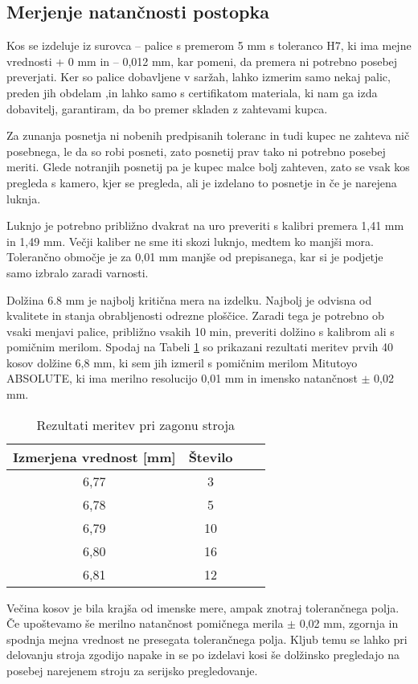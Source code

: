 \subsection{Merjenje natančnosti postopka}
Kos se izdeluje iz surovca -- palice s premerom 5 mm s toleranco
H7, ki ima mejne vrednosti + 0 mm in -- 0,012 mm, kar pomeni,
da premera ni potrebno posebej preverjati. Ker so palice
dobavljene v saržah, lahko izmerim samo nekaj palic, preden
jih obdelam ,in lahko samo s certifikatom materiala, ki nam
ga izda dobavitelj, garantiram, da bo premer skladen z
zahtevami kupca.

Za zunanja posnetja ni nobenih predpisanih toleranc in tudi
kupec ne zahteva nič posebnega, le da so robi posneti, zato posnetij prav tako ni potrebno posebej meriti. Glede notranjih
posnetij pa je kupec malce bolj zahteven, zato se
vsak kos pregleda s kamero, kjer se pregleda, ali je izdelano
to posnetje in če je narejena luknja.

Luknjo je potrebno približno dvakrat na uro preveriti s
kalibri premera 1,41 mm in 1,49 mm. Večji kaliber ne sme iti
skozi luknjo, medtem ko manjši mora. Tolerančno območje je za 0,01 mm
manjše od prepisanega, kar si je podjetje samo izbralo zaradi
varnosti.

Dolžina 6.8 mm je najbolj kritična mera na izdelku.
Najbolj je odvisna od kvalitete in stanja obrabljenosti
odrezne ploščice. Zaradi tega je potrebno ob vsaki menjavi
palice, približno vsakih 10 min, preveriti dolžino s kalibrom
ali s pomičnim merilom. Spodaj na Tabeli \ref{tabela_meritev}
so prikazani rezultati meritev prvih 40 kosov dolžine 6,8 mm,
ki sem jih izmeril s pomičnim merilom Mitutoyo ABSOLUTE,
ki ima merilno resolucijo 0,01 mm in imensko natančnost \(\pm\) 0,02 mm.

\begin{table}[H]
	\caption{Rezultati meritev pri zagonu stroja}
	\label{tabela_meritev}
	\begin{center}
		\begin{tabular}{|c|c|c|c|}
			\hline
			Izmerjena vrednost [mm] & Število \\
			\hline
			6,77                    & 3       \\
			\hline
			6,78                    & 5       \\
			\hline
			6,79                    & 10      \\
			\hline
			6,80                    & 16      \\
			\hline
			6,81                    & 12      \\
			\hline
		\end{tabular}
	\end{center}
\end{table}

Večina kosov je bila krajša od imenske mere, ampak znotraj tolerančnega
polja. Če upoštevamo še merilno natančnost pomičnega merila \(\pm\) 0,02 mm,
zgornja in spodnja mejna vrednost ne presegata tolerančnega polja.
Kljub temu se lahko pri delovanju stroja zgodijo napake
in se po izdelavi kosi še dolžinsko pregledajo na posebej
narejenem stroju za serijsko pregledovanje.
